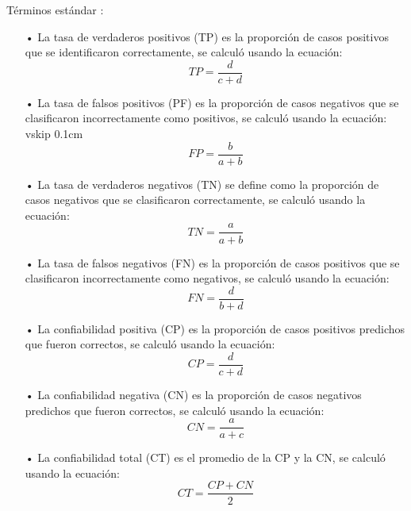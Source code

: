\documentclass[a4paper, 12pt]{article}
\begin{document}
Términos estándar :\par
\vskip 0.1cm
\begin{enumerate}

\item[•] La tasa de verdaderos positivos (TP) es la proporción de casos positivos que se identificaron correctamente, se calculó usando la ecuación:
\vskip 0.1cm
\begin{equation}
TP = \frac{d}{c + d}
\end{equation}
\vskip 0.1cm
\item[•] La tasa de falsos positivos (PF) es la proporción de casos negativos que se clasificaron incorrectamente como positivos, se calculó usando la ecuación:
vskip 0.1cm
\begin{equation}
FP = \frac{b}{a + b}
\end{equation}
\vskip 0.1cm
\item[•] La tasa de verdaderos negativos (TN) se define como la proporción de casos negativos que se clasificaron correctamente, se calculó usando la ecuación:
\vskip 0.1cm
\begin{equation}
TN = \frac{a}{a + b}
\end{equation}
\vskip 0.1cm
\item[•] La tasa de falsos negativos (FN) es la proporción de casos positivos que se clasificaron incorrectamente como negativos, se calculó usando la ecuación:
\vskip 0.1cm
\begin{equation}
FN = \frac{d}{b + d}
\end{equation}
\vskip 0.1cm
\item[•] La confiabilidad positiva  (CP) es la proporción de casos positivos predichos que fueron correctos, se calculó usando la ecuación:
\vskip 0.1cm
\begin{equation}
CP = \frac{d}{c + d}
\end{equation}
\vskip 0.1cm
\item[•] La confiabilidad negativa  (CN) es la proporción de casos negativos predichos que fueron correctos, se calculó usando la ecuación:
\vskip 0.1cm
\begin{equation}
CN = \frac{a}{a + c}
\end{equation}
\vskip 0.1cm
\item[•] La confiabilidad total  (CT) es el promedio de la CP y la CN, se calculó usando la ecuación:
\vskip 0.1cm
\begin{equation}
CT = \frac{CP + CN}{2}
\end{equation}
\vskip 0.1cm
\end{enumerate}
\end{document}
